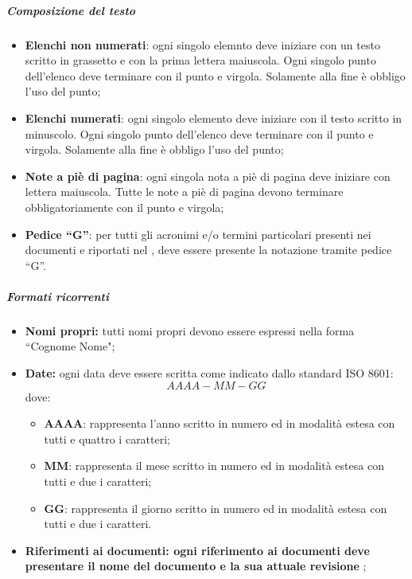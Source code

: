 				\subparagraph{Composizione del testo}
				\begin{itemize}
					\item \textbf{Elenchi non numerati}: ogni singolo elemnto deve iniziare con un testo scritto in grassetto e con la prima lettera maiuscola. Ogni singolo punto dell'elenco deve terminare con il punto e virgola. Solamente alla fine è obbligo l'uso del punto;
					\item \textbf{Elenchi numerati}: ogni singolo elemento deve iniziare con il testo scritto in minuscolo. Ogni singolo punto dell'elenco deve terminare con il punto e virgola. Solamente alla fine è obbligo l'uso del punto;
					\item \textbf{Note a piè di pagina}: ogni singola nota a piè di pagina deve iniziare con lettera maiuscola. Tutte le note a piè di pagina devono terminare obbligatoriamente con il punto e virgola;
					\item \textbf{Pedice ``G''}: per tutti gli acronimi e/o termini particolari presenti nei documenti e riportati nel \docGlossary, deve essere presente la notazione tramite pedice ``G''.
				\end{itemize}

				\subparagraph{Formati ricorrenti}
				\begin{itemize}
					\item \textbf{Nomi propri:} tutti nomi propri devono essere espressi nella forma ``Cognome Nome";
					\item \textbf{Date:} ogni data deve essere scritta come indicato dallo standard ISO 8601:\\
						\begin{displaymath}
							AAAA-MM-GG
						\end{displaymath}
						dove:
						\begin{itemize}
							\item \textbf{AAAA}: rappresenta l'anno scritto in numero ed in modalità estesa con tutti e quattro i caratteri;
							\item \textbf{MM}: rappresenta il mese scritto in numero ed in modalità estesa con tutti e due i caratteri;
							\item \textbf{GG}: rappresenta il giorno scritto in numero ed in modalità estesa con tutti e due i caratteri.
						\end{itemize}
						\item \textbf{Riferimenti ai documenti: ogni riferimento ai documenti deve presentare il nome del documento e la sua attuale revisione} ;
				\end{itemize}


